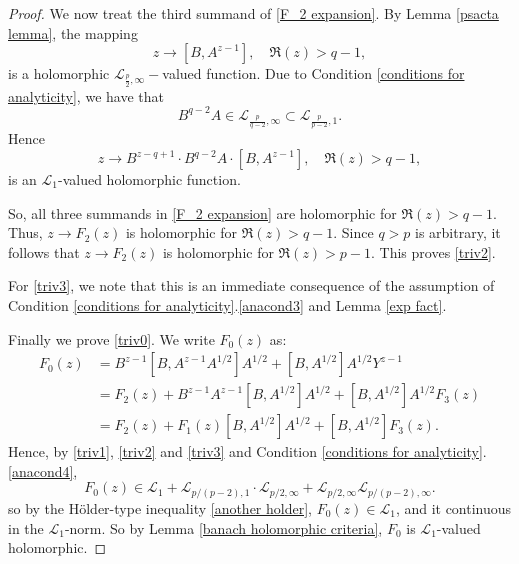 \begin{proof}
        We now treat the third summand of \eqref{F_2 expansion}. 
        By Lemma \ref{psacta lemma}, the mapping
        $$z\to [B,A^{z-1}],\quad\Re(z)>q-1,$$
        is a holomorphic $\mathcal{L}_{\frac{p}{2},\infty}-$valued function. Due to Condition \ref{conditions for analyticity}, we have that
        $$B^{q-2}A\in\mathcal{L}_{\frac{p}{q-2},\infty}\subset\mathcal{L}_{\frac{p}{p-2},1}.$$
        Hence
        $$z\to B^{z-q+1}\cdot B^{q-2}A\cdot [B,A^{z-1}],\quad\Re(z)>q-1,$$
        is an $\mathcal{L}_{1}$-valued holomorphic function.

        So, all three summands in \eqref{F_2 expansion} are holomorphic for $\Re(z)>q-1.$ Thus, $z\to F_2(z)$ is holomorphic for $\Re(z)>q-1.$ Since $q>p$ is arbitrary, it follows that $z\to 
        F_2(z)$ is holomorphic for $\Re(z)>p-1.$ This proves \eqref{triv2}.

        For \eqref{triv3}, we note that this is an immediate consequence of the assumption of Condition \ref{conditions for analyticity}.\eqref{anacond3}
        and Lemma \ref{exp fact}.
        
        Finally we prove \eqref{triv0}. We write $F_0(z)$ as:
        \begin{align*}
            F_0(z) &= B^{z-1}[B,A^{z-1}A^{1/2}]A^{1/2}+[B,A^{1/2}]A^{1/2}Y^{z-1}\\
                   &= F_2(z)+B^{z-1}A^{z-1}[B,A^{1/2}]A^{1/2}+[B,A^{1/2}]A^{1/2}F_3(z)\\
                   &= F_2(z)+F_1(z)[B,A^{1/2}]A^{1/2}+[B,A^{1/2}]F_3(z).
        \end{align*}
        Hence, by \eqref{triv1}, \eqref{triv2} and \eqref{triv3} and Condition \ref{conditions for analyticity}.\eqref{anacond4},
        \begin{equation*}
            F_0(z) \in \mathcal{L}_1+\mathcal{L}_{p/(p-2),1}\cdot \mathcal{L}_{p/2,\infty}+\mathcal{L}_{p/2,\infty}\mathcal{L}_{p/(p-2),\infty}.
        \end{equation*}
        so by the H\"older-type inequality \eqref{another holder}, $F_0(z) \in \mathcal{L}_1$, and it continuous in the $\mathcal{L}_1$-norm. So by Lemma \ref{banach holomorphic criteria}, $F_0$ is $\mathcal{L}_1$-valued holomorphic.
    \end{proof}

